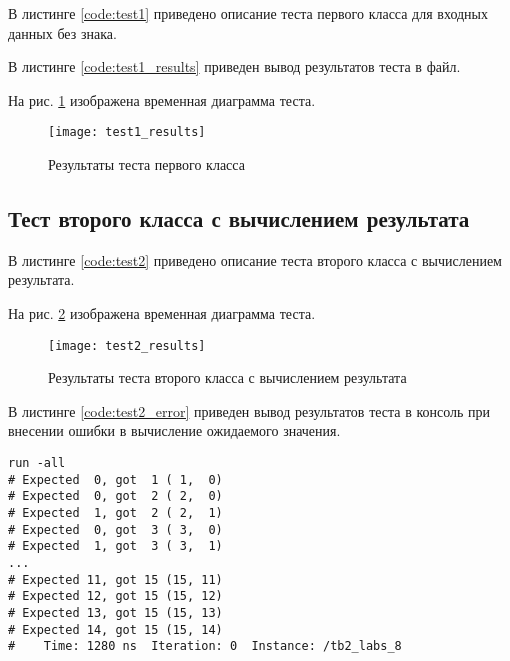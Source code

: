 В листинге \ref{code:test1} приведено описание теста первого класса для входных данных без знака.


В листинге \ref{code:test1_results} приведен вывод результатов теста в файл.


На рис. \ref{fig:test1_results} изображена временная диаграмма теста.
\vspace{-0.5cm}
\begin{figure}[H]
	\begin{center}
		\texttt{[image: test1\_results]}
		\caption{Результаты теста первого класса}
		\label{fig:test1_results}
	\end{center}
\end{figure}
\vspace{-1cm}

\subsection{Тест второго класса с вычислением результата}

В листинге \ref{code:test2} приведено описание теста второго класса с вычислением результата.


На рис. \ref{fig:test2_results} изображена временная диаграмма теста.
\vspace{-0.5cm}
\begin{figure}[H]
	\begin{center}
		\texttt{[image: test2\_results]}
		\caption{Результаты теста второго класса с вычислением результата}
		\label{fig:test2_results}
	\end{center}
\end{figure}

В листинге \ref{code:test2_error} приведен вывод результатов теста в консоль при внесении ошибки в вычисление ожидаемого значения.	
\begin{lstlisting}[caption=Результаты ошибочного теста второго класса с вычислением результата, label=code:test2_error, style=console]
run -all
# Expected  0, got  1 ( 1,  0)
# Expected  0, got  2 ( 2,  0)
# Expected  1, got  2 ( 2,  1)
# Expected  0, got  3 ( 3,  0)
# Expected  1, got  3 ( 3,  1)
...
# Expected 11, got 15 (15, 11)
# Expected 12, got 15 (15, 12)
# Expected 13, got 15 (15, 13)
# Expected 14, got 15 (15, 14)
#    Time: 1280 ns  Iteration: 0  Instance: /tb2_labs_8
\end{lstlisting}

